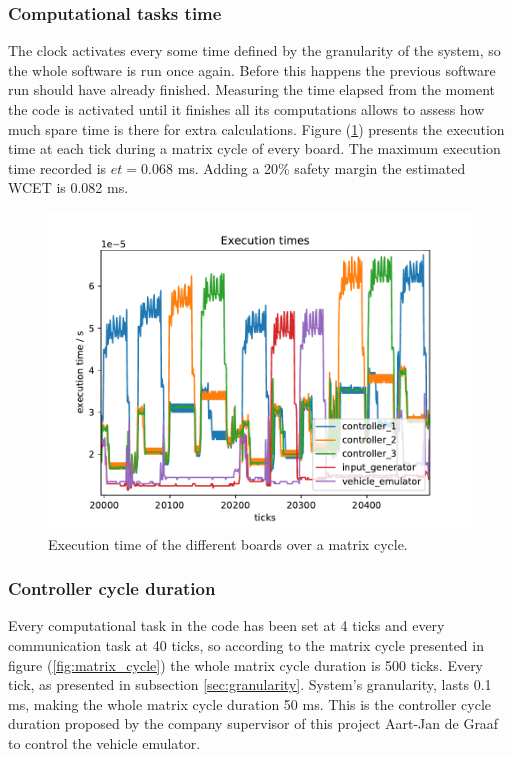 \documentclass[table,xcdraw]{article}
\begin{document}
\subsubsection{Computational tasks time}
The clock activates every some time defined by the granularity of the system, so the whole software is run once again. Before this happens the previous software run should have already finished. Measuring the time elapsed from the moment the code is activated until it finishes all its computations allows to assess how much spare time is there for extra calculations. Figure (\ref{fig:mex}) presents the execution time at each tick during a matrix cycle of every board. The maximum execution time recorded is $et = 0.068$ ms. Adding a 20\% safety margin the estimated WCET is 0.082 ms.

\begin{figure}[h!]
    \centering
    \includegraphics[scale = 0.9]{figures/results/mex_14Jan22_graph.pdf}
    \caption{Execution time of the different boards over a matrix cycle.}
    \label{fig:mex}
\end{figure}


\subsubsection{Controller cycle duration}
Every computational task in the code has been set at 4 ticks and every communication task at 40 ticks, so according to the matrix cycle presented in figure (\ref{fig:matrix_cycle}) the whole matrix cycle duration is 500 ticks. Every tick, as presented in subsection \ref{sec:granularity}. System's granularity, lasts 0.1 ms, making the whole matrix cycle duration 50 ms. This is the controller cycle duration proposed by the company supervisor of this project Aart-Jan de Graaf to control the vehicle emulator.
\end{document}
